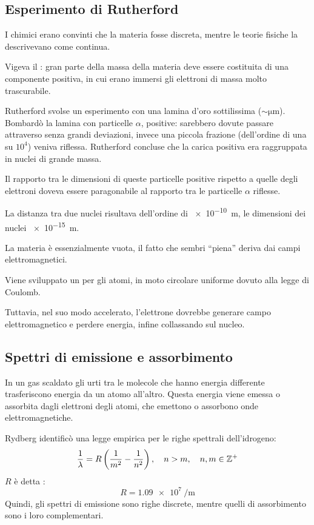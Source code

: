 \subsection{Esperimento di Rutherford}

I chimici erano convinti che la materia fosse discreta, mentre le teorie fisiche la descrivevano come continua.

Vigeva il : gran parte della massa della materia deve essere costituita di una componente positiva, in cui erano immersi gli elettroni di massa molto trascurabile.

Rutherford svolse un esperimento con una lamina d'oro sottilissima ($\sim \unit{\micro\metre}$).
Bombardò la lamina con particelle $\alpha$, positive: sarebbero dovute passare attraverso senza grandi deviazioni, invece una piccola frazione (dell'ordine di una su $10^4$) veniva riflessa.
Rutherford concluse che la carica positiva era raggruppata in nuclei di grande massa.

Il rapporto tra le dimensioni di queste particelle positive rispetto a quelle degli elettroni doveva essere paragonabile al rapporto tra le particelle $\alpha$ riflesse.

La distanza tra due nuclei risultava dell'ordine di \qty{e-10}{\metre}, le dimensioni dei nuclei \qty{e-15}{\metre}.

La materia è essenzialmente vuota, il fatto che sembri ``piena'' deriva dai campi elettromagnetici.

Viene sviluppato un  per gli atomi, in moto circolare uniforme dovuto alla legge di Coulomb.

Tuttavia, nel suo modo accelerato, l'elettrone dovrebbe generare campo elettromagnetico e perdere energia, infine collassando sul nucleo.


\subsection{Spettri di emissione e assorbimento}

In un gas scaldato gli urti tra le molecole che hanno energia differente trasferiscono energia da un atomo all'altro.
Questa energia viene emessa o assorbita dagli elettroni degli atomi, che emettono o assorbono onde elettromagnetiche.

Rydberg identificò una legge empirica per le righe spettrali dell'idrogeno:
\begin{equation}
\label{eq:rydberg}
    \frac{1}{\lambda} = R \left( \frac{1}{m^2} - \frac{1}{n^2} \right), \quad n > m, \quad n, m \in \mathbb{Z}^+
\end{equation}
$R$ è detta :
\begin{equation}
    R = \qty{1.09e7}{\per\metre}
\end{equation}
Quindi, gli spettri di emissione sono righe discrete, mentre quelli di assorbimento sono i loro complementari.

